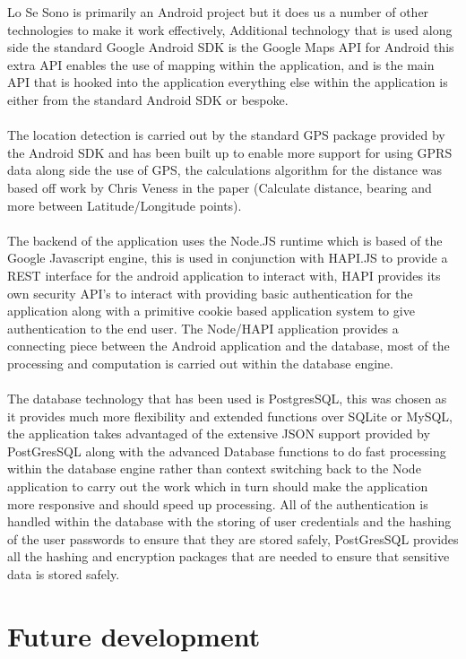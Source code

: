 \documentclass[a0,landscape]{a0poster}
\begin{document}
\begin{multicols}{4}
Lo Se Sono is primarily an Android project but it does us a number of other technologies to make it work effectively, Additional technology that is used along side the standard Google Android SDK is the Google Maps API for Android this extra API enables the use of mapping within the application, and is the main API that is hooked into the application everything else within the application is either from the standard Android SDK or bespoke.\\ 
\\
The location detection is carried out by the standard GPS package provided by the Android SDK and has been built up to enable more support for using GPRS data along side the use of GPS, the calculations algorithm for the distance was based off work by Chris Veness in the paper (Calculate distance, bearing and more between Latitude/Longitude points).\\
\\
The backend of the application uses the Node.JS runtime which is based of the Google Javascript engine, this is used in conjunction with HAPI.JS to provide a REST interface for the android application to interact with, HAPI provides its own security API's to interact with providing basic authentication for the application along with a primitive cookie based application system to give authentication to the end user. The Node/HAPI application provides a connecting piece between the Android application and the database, most of the processing and computation is carried out within the database engine.\\
\\
The database technology that has been used is PostgresSQL, this was chosen as it provides much more flexibility and extended functions over SQLite or MySQL, the application takes advantaged of the extensive JSON support provided by PostGresSQL along with the advanced Database functions to do fast processing within the database engine rather than context switching back to the Node application to carry out the work which in turn should make the application more responsive and should speed up processing. All of the authentication is handled within the database with the storing of user credentials and the hashing of the user passwords to ensure that they are stored safely, PostGresSQL provides all the hashing and encryption packages that are needed to ensure that sensitive data is stored safely.

\section{Future development}


\end{multicols}
\end{document}
